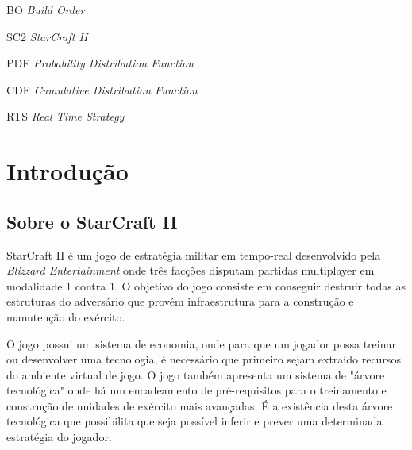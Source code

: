 
\listoffigures*
\cleardoublepage

\listoftables*
\cleardoublepage

\begin{siglas}
	\item[BO]		\emph{Build Order}
	\item[SC2]		\emph{StarCraft II}
	\item[PDF]		\emph{Probability Distribution Function}
	\item[CDF]		\emph{Cumulative Distribution Function}
	\item[RTS]		\emph{Real Time Strategy}
\end{siglas}

\tableofcontents*
\cleardoublepage

\textual
	\chapter{Introdução}
		\section{Sobre o StarCraft II}

StarCraft II é um jogo de estratégia militar em tempo-real desenvolvido pela \textit{Blizzard Entertainment} onde três facções disputam partidas multiplayer em modalidade 1 contra 1. O objetivo do jogo consiste em conseguir destruir todas as estruturas do adversário que provém infraestrutura para a construção e manutenção do exército.

O jogo possui um sistema de economia, onde para que um jogador possa treinar ou desenvolver uma tecnologia, é necessário que primeiro sejam extraído recursos do ambiente virtual de jogo. O jogo também apresenta um sistema de "árvore tecnológica" onde há um encadeamento de pré-requisitos para o treinamento e construção de unidades de exército mais avançadas. É a existência desta árvore tecnológica que possibilita que seja possível inferir e prever uma determinada estratégia do jogador. 

